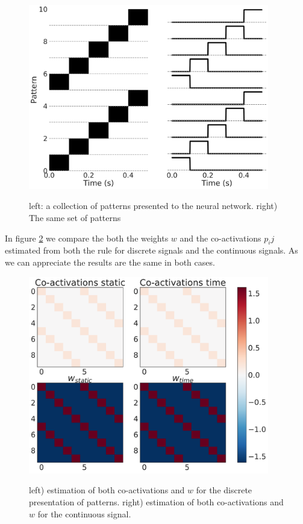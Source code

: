 \documentclass[10pt,a4paper]{article}
\begin{document}
\begin{figure}[H]
    \centering
    \includegraphics[width=10.5cm]{off_line_rule_illustration_signal.pdf} 
	\label{fig:off_line_rule_signal}
	\caption{left: a collection of patterns presented to the neural network. right) The same set of patterns }
\end{figure}

In figure \ref{fig:off_line_rule_weights} we compare the both the weights $w$ and the co-activations $p_ij$ estimated from both the rule for discrete signals and the continuous signals. As we can appreciate the results are the same in both cases.

\begin{figure}[H]
    \centering
     \includegraphics[width=10.5cm]{off_line_rule_illustration_weight.pdf} %
	\label{fig:off_line_rule_weights}
	\caption{left) estimation of both co-activations and $w$ for the discrete presentation of patterns. right) estimation of both co-activations and $w$ for the continuous signal. }
\end{figure}
\end{document}
